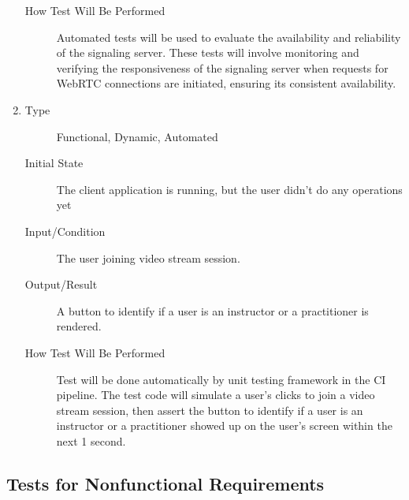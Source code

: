 \documentclass[12pt, titlepage]{article}
\begin{document}
\begin{enumerate}[FR-T1]
\begin{description}
  \item[How Test Will Be Performed] Automated tests will be used to evaluate the
    availability and reliability of the signaling server. These tests will
    involve monitoring and verifying the responsiveness of the signaling server
    when requests for WebRTC connections are initiated, ensuring its consistent
    availability.
  \end{description}
\item \label{FRT12}
  \begin{description}
  \item[Type] Functional, Dynamic, Automated
  \item[Initial State] The client application is running, but the user didn’t do
    any operations yet
  \item[Input/Condition] The user joining video stream session.
  \item[Output/Result] A button to identify if a user is an instructor or a
    practitioner is rendered.
  \item[How Test Will Be Performed] Test will be done automatically by unit
    testing framework in the CI pipeline. The test code will simulate a user's
    clicks to join a video stream session, then assert the button to identify if
    a user is an instructor or a practitioner showed up on the user's screen
    within the next 1 second.
  \end{description}
\end{enumerate}

\subsection{Tests for Nonfunctional Requirements}
\end{document}

